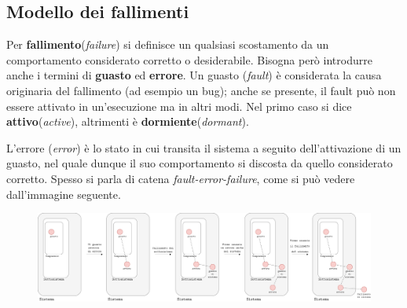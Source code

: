 \subsection{Modello dei fallimenti}
Per \textbf{fallimento}(\textit{failure}) si definisce un qualsiasi scostamento da un comportamento considerato corretto o desiderabile. Bisogna però introdurre anche i termini di \textbf{guasto} ed \textbf{errore}.
Un guasto (\textit{fault}) è considerata la causa originaria del fallimento (ad esempio un bug); anche se presente, il fault può non essere attivato in un'esecuzione ma in altri modi. Nel primo caso si dice \textbf{attivo}(\textit{active}), altrimenti è \textbf{dormiente}(\textit{dormant}).

L'errore (\textit{error}) è lo stato in cui transita il sistema a seguito dell'attivazione di un guasto, nel quale dunque il suo comportamento si discosta da quello considerato corretto. Spesso si parla di catena \textit{fault-error-failure}, come si può vedere dall'immagine seguente.

\begin{figure}[ht]
    \centering
    \includegraphics[width=14cm]{./Images/cap2/2.2.png}
    \label{fig:image2.2}
\end{figure}

